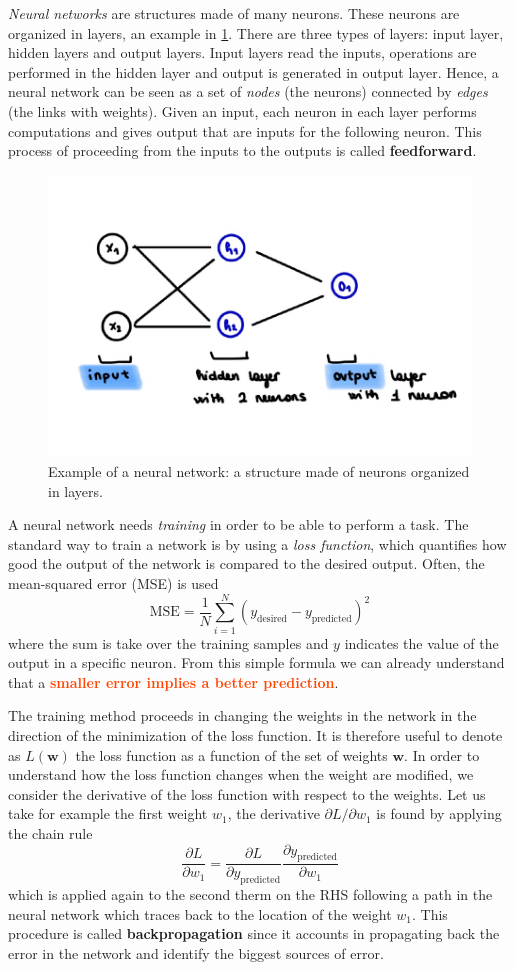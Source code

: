 \documentclass[10.5pt]{article}
\newcommand{\important}[1]{\textcolor{OrangeRed}{\bf{#1}}}
\begin{document}
\textit{Neural networks} are structures made of many neurons. These neurons are organized in layers, an example in \cref{fig:neural_ntw}. There are three types of layers: input layer, hidden layers and output layers. Input layers read the inputs, operations are performed in the hidden layer and output is generated in output layer. Hence, a neural network can be seen as a set of \textit{nodes} (the neurons) connected by \textit{edges} (the links with weights).
Given an input, each neuron in each layer performs computations and gives output that are inputs for the following neuron. This process of proceeding from the inputs to the outputs is called \textbf{feedforward}.
\begin{figure}[h]
    \centering
    \includegraphics[width=0.6\columnwidth]{../figures_tex/neural_ntw.pdf}
    \caption{Example of a neural network: a structure made of neurons organized in layers.}
    \label{fig:neural_ntw}
\end{figure} 

A neural network needs \textit{training} in order to be able to perform a task. The standard way to train a network is by using a \textit{loss function}, which quantifies how good the output of the network is compared to the desired output. Often, the mean-squared error (MSE) is used
\[
\text{MSE} = \frac{1}{N} \sum_{i=1}^{N} (y_{\text{desired}} - y_{\text{predicted}})^2    
\]
where the sum is take over the training samples and $y$ indicates the value of the output in a specific neuron. From this simple formula we can already understand that a \important{smaller error implies a better prediction}. 

The training method proceeds in changing the weights in the network in the direction of the minimization of the loss function. It is therefore useful to denote as $L(\mathbf{w})$ the loss function as a function of the set of weights $\mathbf{w}$. In order to understand how the loss function changes when the weight are modified, we consider the derivative of the loss function with respect to the weights. Let us take for example the first weight $w_1$, the derivative $\partial L/\partial w_1$ is found by applying the chain rule
\[
\frac{\partial L}{\partial w_1} = \frac{\partial L}{\partial y_{\text{predicted}}} \frac{\partial y_{\text{predicted}}}{\partial w_1}    
\]
which is applied again to the second therm on the RHS following a path in the neural network which traces back to the location of the weight $w_1$. This procedure is called \textbf{backpropagation} since it accounts in propagating back the error in the network and identify the biggest sources of error. 
\end{document}
